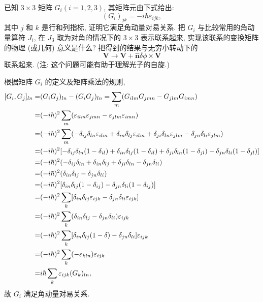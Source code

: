 \documentclass{assignment}
\begin{document}
\begin{prob}[课本习题 3.14]
    已知 $3\times 3$ 矩阵 $G_i(i=1,2,3)$, 其矩阵元由下式给出:
    \[
        (G_i)_{jk}=-i\hbar\varepsilon_{ijk},
    \]
    其中 $j$ 和 $k$ 是行和列指标, 证明它满足角动量对易关系. 把 $G_i$ 与比较常用的角动量算符 $J_i$, 在 $J_3$ 取为对角的情况下的 $3\times 3$ 表示联系起来, 实现该联系的变换矩阵的物理 (或几何) 意义是什么? 把得到的结果与无穷小转动下的
    \[
        \bm{V}\rightarrow\bm{V}+\hat{\bm{n}}\delta\phi\times\bm{V}
    \]
    联系起来. (注: 这个问题可能有助于理解光子的自旋.)
\end{prob}
\begin{pf}
    根据矩阵 $G_i$ 的定义及矩阵乘法的规则,
    \begin{align}
        \notag[G_i,G_j]_{ln}=&(G_iG_j)_{ln}-(G_iG_j)_{ln}=\sum_m(G_{ilm}G_{jmn}-G_{jlm}G_{imn})\\
        \notag=&(-i\hbar)^2\sum_m(\varepsilon_{ilm}\varepsilon_{jmn}-\varepsilon_{jlm}\varepsilon_{imn})\\
        \notag=&(-i\hbar)^2\sum_m(-\delta_{ij}\delta_{ln}\varepsilon_{ilm}+\delta_{in}\delta_{lj}\varepsilon_{ilm}+\delta_{ji}\delta_{ln}\varepsilon_{jlm}-\delta_{jn}\delta_{li}\varepsilon_{jlm})\\
        \notag=&(-i\hbar)^2[-\delta_{ij}\delta_{ln}(1-\delta_{il})+\delta_{in}\delta_{lj}(1-\delta_{il})+\delta_{ji}\delta_{ln}(1-\delta_{jl})-\delta_{jn}\delta_{li}(1-\delta_{jl})]\\
        \notag=&(-i\hbar)^2(-\delta_{ij}\delta_{ln}+\delta_{in}\delta_{lj}+\delta_{ji}\delta_{ln}-\delta_{jn}\delta_{li})\\
        \notag=&(-i\hbar)^2(\delta_{in}\delta_{lj}-\delta_{jn}\delta_{li})\\
        \notag=&(-i\hbar)^2[\delta_{in}\delta_{lj}(1-\delta_{ij})-\delta_{jn}\delta_{li}(1-\delta_{ij})]\\
        \notag=&(-i\hbar)^2\sum_k[\delta_{in}\delta_{lj}\varepsilon_{ijk}-\delta_{jn}\delta_{li}\varepsilon_{ijk}]\\
        \notag=&(-i\hbar)^2\sum_k(\delta_{in}\delta_{lj}-\delta_{jn}\delta_{li})\varepsilon_{ijk}\\
        \notag=&(-i\hbar)^2\sum_k[\delta_{in}\delta_{lj}(1-\delta)-\delta_{jn}\delta_{li}]\varepsilon_{ijk}\\
        \notag=&(-i\hbar)^2\sum_k(-\varepsilon_{kln})\varepsilon_{ijk}\\
        =&i\hbar\sum_k\varepsilon_{ijk}(G_k)_{ln},
    \end{align}
    故 $G_i$ 满足角动量对易关系.


\end{pf}
\end{document}
